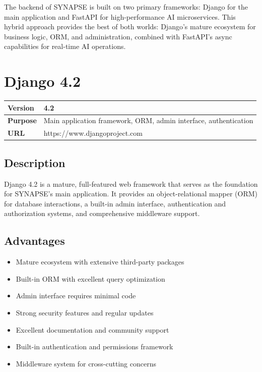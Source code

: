 \documentclass[12pt,a4paper]{report}
\begin{document}
The backend of SYNAPSE is built on two primary frameworks: Django for the main application and FastAPI for high-performance AI microservices. This hybrid approach provides the best of both worlds: Django's mature ecosystem for business logic, ORM, and administration, combined with FastAPI's async capabilities for real-time AI operations.

\section{Django 4.2}

\begin{tabular}{|p{4cm}|p{10cm}|}
\hline
\textbf{Version} & 4.2 \\
\hline
\textbf{Purpose} & Main application framework, ORM, admin interface, authentication \\
\hline
\textbf{URL} & https://www.djangoproject.com \\
\hline
\end{tabular}

\subsection{Description}

Django 4.2 is a mature, full-featured web framework that serves as the foundation for SYNAPSE's main application. It provides an object-relational mapper (ORM) for database interactions, a built-in admin interface, authentication and authorization systems, and comprehensive middleware support.

\subsection{Advantages}

\begin{itemize}
    \item Mature ecosystem with extensive third-party packages
    \item Built-in ORM with excellent query optimization
    \item Admin interface requires minimal code
    \item Strong security features and regular updates
    \item Excellent documentation and community support
    \item Built-in authentication and permissions framework
    \item Middleware system for cross-cutting concerns
\end{itemize}
\end{document}
